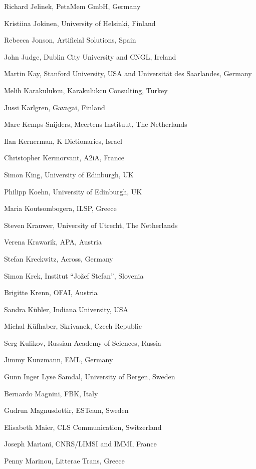 \documentclass[10pt, plain]{../../metanetpaper}
\begin{document}
\begin{multicols}{3}
\begin{small}
\begin{enumerate}
{      \item Richard Jelinek, PetaMem GmbH, Germany
      \item Kristiina Jokinen, University of Helsinki, Finland
      \item Rebecca Jonson, Artificial Solutions, Spain
      \item John Judge, Dublin City University and CNGL, Ireland
      \item Martin Kay, Stanford University, USA and Universität des Saarlandes, Germany
      \item Melih Karakulukcu, Karakulukcu Consulting, Turkey
      \item Jussi Karlgren, Gavagai, Finland
      \item Marc Kemps-Snijders, Meertens Instituut, The Netherlands
      \item Ilan Kernerman, K Dictionaries, Israel
      \item Christopher Kermorvant, A2iA, France
      \item Simon King, University of Edinburgh, UK
      \item Philipp Koehn, University of Edinburgh, UK
      \item Maria Koutsombogera, ILSP, Greece
      \item Steven Krauwer, University of Utrecht, The Netherlands
      \item Verena Krawarik, APA, Austria
      \item Stefan Kreckwitz, Across, Germany
      \item Simon Krek, Institut ``Jožef Stefan'', Slovenia
      \item Brigitte Krenn, OFAI, Austria
      \item Sandra Kübler, Indiana University, USA
      \item Michal Küfhaber, Skrivanek, Czech Republic
      \item Serg Kulikov, Russian Academy of Sciences, Russia
      \item Jimmy Kunzmann, EML, Germany
      \item Gunn Inger Lyse Samdal, University of Bergen, Sweden
      \item Bernardo Magnini, FBK, Italy
      \item Gudrun Magnusdottir, ESTeam, Sweden
      \item Elisabeth Maier, CLS Communication, Switzerland
      \item Joseph Mariani, CNRS/LIMSI and IMMI, France
      \item Penny Marinou, Litterae Trans, Greece
}
\end{enumerate}
\end{small}
\end{multicols}
\end{document}
